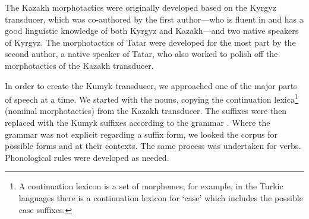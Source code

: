 \documentclass[a4paper,11pt,twocolumn]{article}
\begin{document}
The Kazakh morphotactics were originally developed based on the Kyrgyz transducer, which was co-authored by the first author---who is fluent in and has a good linguistic knowledge of both Kyrgyz and Kazakh---and two native speakers of Kyrgyz.  The morphotactics of Tatar were developed for the most part by the second author, a native speaker of Tatar, who also worked to polish off the morphotactics of the Kazakh transducer.


In order to create the Kumyk transducer, we approached one of the major parts of speech at a time. We started with the nouns, copying the 
continuation lexica\footnote{A continuation lexicon is a set of morphemes; for example, in the Turkic languages there is a continuation lexicon for `case' which includes the possible case suffixes.} (nominal morphotactics) from the Kazakh transducer. The suffixes were then replaced with the Kumyk suffixes according to the grammar \citep{olmesov2000}. Where the grammar was not explicit regarding a suffix form, we looked the corpus for possible forms and at their contexts. The same process was undertaken for verbs.  Phonological rules were developed as needed.

\end{document}

